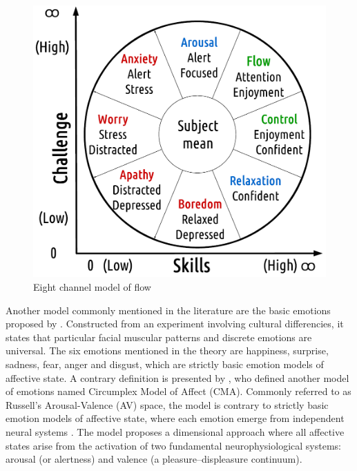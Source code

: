 \begin{figure}[h!]
    \centering
    \includegraphics[scale=0.3]{Content/figures/flow-eight.png}
    \caption{Eight channel model of flow \parencite{nakamura2014concept}}
    \label{fig:flow-eight}
\end{figure}

Another model commonly mentioned in the literature are the basic emotions proposed by \textcite{ekman1971constants}. Constructed from an experiment involving cultural differencies, it states that particular facial muscular patterns and discrete emotions are universal. The six emotions mentioned in the theory are happiness, surprise, sadness, fear, anger and disgust, which are strictly basic emotion models of affective state. A contrary definition is presented by \textcite{russell1978evidence}, who defined another model of emotions named Circumplex Model of Affect (CMA). Commonly referred to as Russell's Arousal-Valence (AV) space, the model is contrary to strictly basic emotion models of affective state, where each emotion emerge from independent neural systems \parencite{posner2005circumplex}. The model proposes a dimensional approach where all affective states arise from the activation of two fundamental neurophysiological systems: arousal (or alertness) and valence (a pleasure–displeasure continuum).

